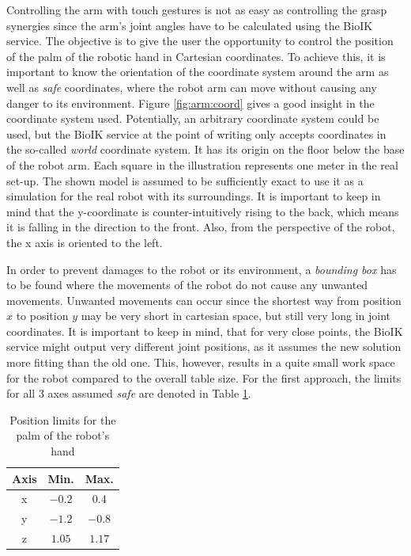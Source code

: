 Controlling the arm with touch gestures is not as easy as controlling the grasp synergies since the arm's joint angles have to be calculated using the BioIK service. The objective is to give the user the opportunity to control the position of the palm of the robotic hand in Cartesian coordinates. To achieve this, it is important to know the orientation of the coordinate system around the arm as well as \textit{safe} coordinates, where the robot arm can move without causing any danger to its environment. Figure \ref{fig:arm:coord} gives a good insight in the coordinate system used. Potentially, an arbitrary coordinate system could be used, but the BioIK service at the point of writing only accepts coordinates in the so-called \textit{world} coordinate system. It has its origin on the floor below the base of the robot arm. Each square in the illustration represents one meter in the real set-up. The shown model is assumed to be sufficiently exact to use it as a simulation for the real robot with its surroundings. It is important to keep in mind that the y-coordinate is counter-intuitively rising to the back, which means it is falling in the direction to the front. Also, from the perspective of the robot, the x axis is oriented to the left.

In order to prevent damages to the robot or its environment, a \textit{bounding box} has to be found where the movements of the robot do not cause any unwanted movements. Unwanted movements can occur since the shortest way from position $x$ to position $y$ may be very short in cartesian space, but still very long in joint coordinates. It is important to keep in mind, that for very close points, the BioIK service might output very different joint positions, as it assumes the new solution more fitting than the old one. This, however, results in a quite small work space for the robot compared to the overall table size. For the first approach, the limits for all 3 axes assumed \textit{safe} are denoted in Table \ref{tab:safeaxes}.

\begin{table}
	\caption{\label{tab:safeaxes}Position limits for the palm of the robot's hand}
	\begin{tabular}{|c|c|c|}
		\hline
		\textbf{Axis} & \textbf{Min.} & \textbf{Max.} \\
		\hline
		x & $-0.2$ & $0.4$ \\
		\hline
		y & $-1.2$ & $-0.8$ \\
		\hline
		z & $1.05$ & $1.17$ \\
		\hline
	\end{tabular}
\end{table}

